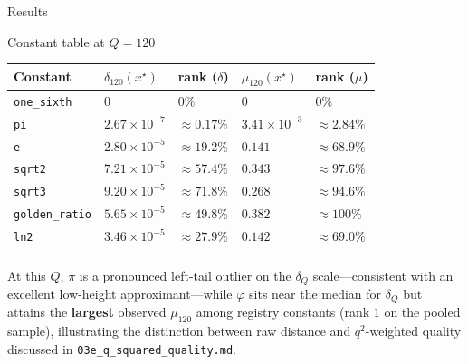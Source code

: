 \documentclass[
  ignorenonframetext,
]{beamer}
\newcounter{none} %
\begin{document}
\begin{frame}[fragile]{Results}
\begin{block}{Constant table at \(Q=120\)}
{\def\LTcaptype{none} %
\begin{longtable}[]{@{}
  >{\raggedright\arraybackslash}p{}
  >{\raggedright\arraybackslash}p{}
  >{\raggedright\arraybackslash}p{}
  >{\raggedright\arraybackslash}p{}
  >{\raggedright\arraybackslash}p{}@{}}
\toprule\noalign{}
\begin{minipage}[b]{\linewidth}\raggedright
Constant
\end{minipage} & \begin{minipage}[b]{\linewidth}\raggedright
\(\delta_{120}(x^\star)\)
\end{minipage} & \begin{minipage}[b]{\linewidth}\raggedright
rank (\(\delta\))
\end{minipage} & \begin{minipage}[b]{\linewidth}\raggedright
\(\mu_{120}(x^\star)\)
\end{minipage} & \begin{minipage}[b]{\linewidth}\raggedright
rank (\(\mu\))
\end{minipage} \\
\midrule\noalign{}
\endhead
\texttt{one\_sixth} & \(0\) & \(0\%\) & \(0\) & \(0\%\) \\
\texttt{pi} & \(2.67\times 10^{-7}\) & \(\approx 0.17\%\) &
\(3.41\times 10^{-3}\) & \(\approx 2.84\%\) \\
\texttt{e} & \(2.80\times 10^{-5}\) & \(\approx 19.2\%\) & \(0.141\) &
\(\approx 68.9\%\) \\
\texttt{sqrt2} & \(7.21\times 10^{-5}\) & \(\approx 57.4\%\) & \(0.343\)
& \(\approx 97.6\%\) \\
\texttt{sqrt3} & \(9.20\times 10^{-5}\) & \(\approx 71.8\%\) & \(0.268\)
& \(\approx 94.6\%\) \\
\texttt{golden\_ratio} & \(5.65\times 10^{-5}\) & \(\approx 49.8\%\) &
\(0.382\) & \(\approx 100\%\) \\
\texttt{ln2} & \(3.46\times 10^{-5}\) & \(\approx 27.9\%\) & \(0.142\) &
\(\approx 69.0\%\) \\
\bottomrule\noalign{}
\end{longtable}
}

At this \(Q\), \(\pi\) is a pronounced left-tail outlier on the
\(\delta_Q\) scale---consistent with an excellent low-height
approximant---while \(\varphi\) sits near the median for \(\delta_Q\)
but attains the \textbf{largest} observed \(\mu_{120}\) among registry
constants (rank \(1\) on the pooled sample), illustrating the
distinction between raw distance and \(q^2\)-weighted quality discussed
in \texttt{03e\_q\_squared\_quality.md}.


\end{block}
\end{frame}
\end{document}
